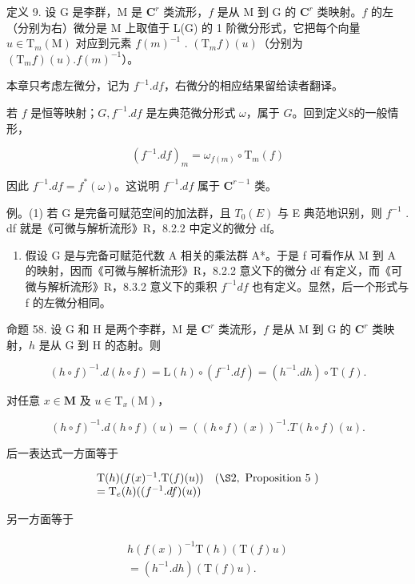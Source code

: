 定义 9. 设 G 是李群，M 是 \(\mathbf{C}^r\) 类流形，\(f\) 是从 M 到 G 的 \(\mathbf{C}^r\) 类映射。\(f\) 的左（分别为右）微分是 M 上取值于 L(G) 的 1 阶微分形式，它把每个向量 \(u \in \mathrm{T}_m(\mathrm{M})\) 对应到元素 \(f(m)^{-1}\) . \((\mathrm{T}_m f)(u)\)（分别为 \((\mathrm{T}_m f)(u). f(m)^{-1}\)）。

本章只考虑左微分，记为 \(f^{-1}.df\)，右微分的相应结果留给读者翻译。

若 \(f\) 是恒等映射；\(G, f^{-1}.df\) 是左典范微分形式 \(\omega\)，属于 \(G\)。回到定义8的一般情形，

\[
(f ^ {- 1}. d f) _ {m} = \omega_ {f (m)} \circ \mathrm{T} _ {m} (f)
\]

因此 \(f^{-1}.df = f^{*}(\omega)\)。这说明 \(f^{-1}.df\) 属于 \(\mathbf{C}^{r - 1}\) 类。

例。(1) 若 G 是完备可赋范空间的加法群，且 \(T_{0}(E)\) 与 E 典范地识别，则 \(f^{-1}\) . df 就是《可微与解析流形》R，8.2.2 中定义的微分 df。

\begin{enumerate}
\def\labelenumi{(\arabic{enumi})}
\setcounter{enumi}{1}
\tightlist
\item
  假设 G 是与完备可赋范代数 A 相关的乘法群 A*。于是 f 可看作从 M 到 A 的映射，因而《可微与解析流形》R，8.2.2 意义下的微分 df 有定义，而《可微与解析流形》R，8.3.2 意义下的乘积 \(f^{-1}df\) 也有定义。显然，后一个形式与 f 的左微分相同。
\end{enumerate}

命题 58. 设 G 和 H 是两个李群，M 是 \(\mathbf{C}^r\) 类流形，\(f\) 是从 M 到 G 的 \(\mathbf{C}^r\) 类映射，\(h\) 是从 G 到 H 的态射。则

\[
(h \circ f) ^ {- 1}. d (h \circ f) = \mathrm{L} (h) \circ (f ^ {- 1}. d f) = (h ^ {- 1}. d h) \circ \mathrm{T} (f).
\]

对任意 \(x \in \mathbf{M}\) 及 \(u \in \mathrm{T}_x(\mathrm{M})\)，

\[
(h \circ f) ^ {- 1}. d (h \circ f) (u) = ((h \circ f) (x)) ^ {- 1}. T (h \circ f) (u).
\]

后一表达式一方面等于

\[
\begin{array}{l l} \mathrm{T} (h) (f (x) ^ {- 1}. \mathrm{T} (f) (u)) & (\S 2, \text { Proposition   5 }) \\ = \mathrm{T} _ {e} (h) ((f ^ {- 1}. d f) (u)) \end{array}
\]

另一方面等于

\[
\begin{array}{c} h (f (x)) ^ {- 1} \mathrm{T} (h) (\mathrm{T} (f) u) \\ = (h ^ {- 1}. d h) (\mathrm{T} (f) u). \end{array}
\]


